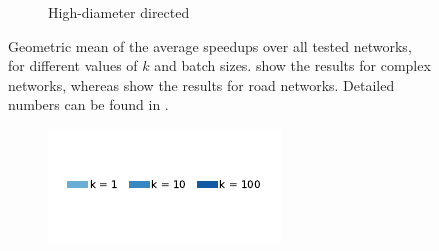 \begin{figure}[tb]
\begin{subfigure}[t]{.5\textwidth}
\begin{subfigure}[t]{.5\textwidth}
\end{subfigure}\hfill
\caption{High-diameter directed}
\label{fig:dyn-topk-speedup-road-dir}
\end{subfigure}
%
\caption{Geometric mean of the average speedups over all tested networks, for
different values of $k$ and batch sizes.
 show the
results for complex networks, whereas
 show
the results for road networks. Detailed numbers can be found in
.}
\label{fig:dyn-topk-speedups-summary}
\end{figure}

\begin{figure}[tb]
\centering
\begin{subfigure}[t]{\textwidth}
\centering
\includegraphics{./sources/plots/dyn-topk/legend-breakdown.pdf}
\end{subfigure}\vspace{-20pt}


\end{figure}
